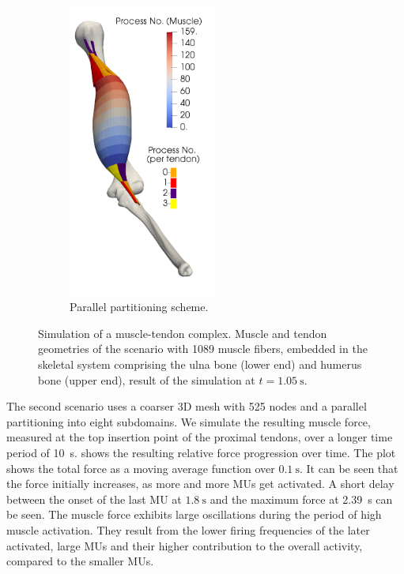 \begin{figure}
  \begin{subfigure}[t]{0.28\textwidth}%
    \centering%
    \includegraphics[height=97mm]{images/results/application/precice_activated_muscles3.png}%
    \caption{Parallel partitioning scheme.}%
    \label{fig:precice_activated_muscles_3}%
  \end{subfigure}
  \caption{Simulation of a muscle-tendon complex. Muscle and tendon geometries of the scenario with 1089 muscle fibers, embedded in the skeletal system comprising the ulna bone (lower end) and humerus bone (upper end), result of the simulation at $t=\SI{1.05}{\s}$.}%
  \label{fig:precice_muscle_force}%
\end{figure}%

The second scenario uses a coarser 3D mesh with 525 nodes and a parallel partitioning into eight subdomains. We simulate the resulting muscle force, measured at the top insertion point of the proximal tendons, over a longer time period of \SI{10}{\s}.  shows the resulting relative force progression over time. The plot shows the total force as a moving average function over $\SI{0.1}{\s}$. It can be seen that the force initially increases, as more and more MUs get activated. A short delay between the onset of the last MU at $\SI{1.8}{\s}$ and the maximum force at \SI{2.39}{\s} can be seen. The muscle force exhibits large oscillations during the period of high muscle activation. They result from the lower firing frequencies of the later activated, large MUs and their higher contribution to the overall activity, compared to the smaller MUs. 

